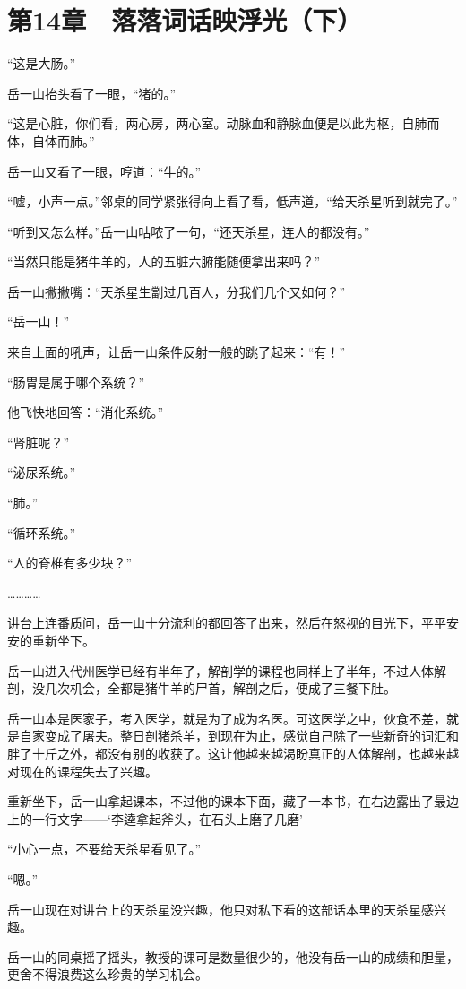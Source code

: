 \section{第14章　落落词话映浮光（下）}

“这是大肠。”

岳一山抬头看了一眼，“猪的。”

“这是心脏，你们看，两心房，两心室。动脉血和静脉血便是以此为枢，自肺而体，自体而肺。”

岳一山又看了一眼，哼道：“牛的。”

“嘘，小声一点。”邻桌的同学紧张得向上看了看，低声道，“给天杀星听到就完了。”

“听到又怎么样。”岳一山咕哝了一句，“还天杀星，连人的都没有。”

“当然只能是猪牛羊的，人的五脏六腑能随便拿出来吗？”

岳一山撇撇嘴：“天杀星生劏过几百人，分我们几个又如何？”

“岳一山！”

来自上面的吼声，让岳一山条件反射一般的跳了起来：“有！”

“肠胃是属于哪个系统？”

他飞快地回答：“消化系统。”

“肾脏呢？”

“泌尿系统。”

“肺。”

“循环系统。”

“人的脊椎有多少块？”

…………

讲台上连番质问，岳一山十分流利的都回答了出来，然后在怒视的目光下，平平安安的重新坐下。

岳一山进入代州医学已经有半年了，解剖学的课程也同样上了半年，不过人体解剖，没几次机会，全都是猪牛羊的尸首，解剖之后，便成了三餐下肚。

岳一山本是医家子，考入医学，就是为了成为名医。可这医学之中，伙食不差，就是自家变成了屠夫。整日剖猪杀羊，到现在为止，感觉自己除了一些新奇的词汇和胖了十斤之外，都没有别的收获了。这让他越来越渴盼真正的人体解剖，也越来越对现在的课程失去了兴趣。

重新坐下，岳一山拿起课本，不过他的课本下面，藏了一本书，在右边露出了最边上的一行文字——‘李逵拿起斧头，在石头上磨了几磨’

“小心一点，不要给天杀星看见了。”

“嗯。”

岳一山现在对讲台上的天杀星没兴趣，他只对私下看的这部话本里的天杀星感兴趣。

岳一山的同桌摇了摇头，教授的课可是数量很少的，他没有岳一山的成绩和胆量，更舍不得浪费这么珍贵的学习机会。


